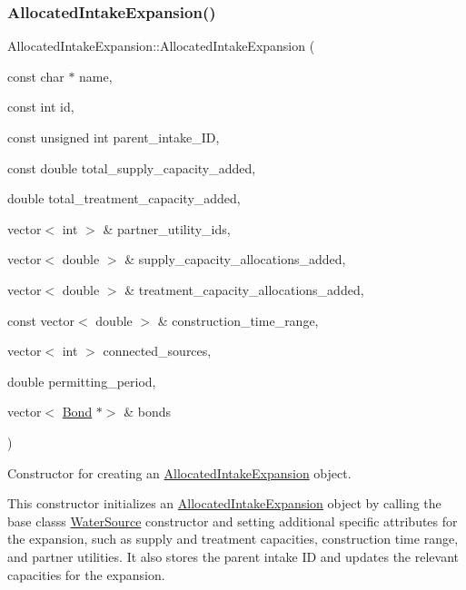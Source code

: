 \subsubsection{\texorpdfstring{Allocated\+Intake\+Expansion()}{AllocatedIntakeExpansion()}\hspace{0.1cm}{\footnotesize\ttfamily [1/2]}}
{\footnotesize\ttfamily Allocated\+Intake\+Expansion\+::\+Allocated\+Intake\+Expansion (\begin{DoxyParamCaption}\item[{const char $\ast$}]{name,  }\item[{const int}]{id,  }\item[{const unsigned int}]{parent\+\_\+intake\+\_\+\+ID,  }\item[{const double}]{total\+\_\+supply\+\_\+capacity\+\_\+added,  }\item[{double}]{total\+\_\+treatment\+\_\+capacity\+\_\+added,  }\item[{vector$<$ int $>$ \&}]{partner\+\_\+utility\+\_\+ids,  }\item[{vector$<$ double $>$ \&}]{supply\+\_\+capacity\+\_\+allocations\+\_\+added,  }\item[{vector$<$ double $>$ \&}]{treatment\+\_\+capacity\+\_\+allocations\+\_\+added,  }\item[{const vector$<$ double $>$ \&}]{construction\+\_\+time\+\_\+range,  }\item[{vector$<$ int $>$}]{connected\+\_\+sources,  }\item[{double}]{permitting\+\_\+period,  }\item[{vector$<$ \mbox{\hyperlink{classBond}{Bond}} $\ast$$>$ \&}]{bonds }\end{DoxyParamCaption})}



Constructor for creating an {\ttfamily \mbox{\hyperlink{classAllocatedIntakeExpansion}{Allocated\+Intake\+Expansion}}} object. 

This constructor initializes an {\ttfamily \mbox{\hyperlink{classAllocatedIntakeExpansion}{Allocated\+Intake\+Expansion}}} object by calling the base class\textquotesingle{}s {\ttfamily \mbox{\hyperlink{classWaterSource}{Water\+Source}}} constructor and setting additional specific attributes for the expansion, such as supply and treatment capacities, construction time range, and partner utilities. It also stores the parent intake ID and updates the relevant capacities for the expansion.


